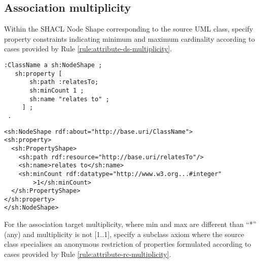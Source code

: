 \subsection{Association multiplicity}

\begin{trule}
	\label{rule:association-uni-multiplicity-dc}
	Within the SHACL Node Shape corresponding to the source UML class, specify property constraints indicating minimum and maximum cardinality according to cases provided by Rule \ref{rule:attribute-ds-multiplicity}.
\end{trule}

\vspace{-\parskip}\vspace{-\parskip}\vspace{-\parskip}
\begin{minipage}[b]{.385\textwidth}
\begin{lstlisting}[language=Turtle, caption={Min cardinality constraint in Turtle syntax}, captionpos=b]
 :ClassName a sh:NodeShape ;
   sh:property [
       sh:path :relatesTo;
       sh:minCount 1 ;
       sh:name "relates to" ;
     ] ;
 .
\end{lstlisting}
\end{minipage}%
\quad\vspace{-\parskip}
\begin{minipage}[b]{.6\textwidth}
\begin{lstlisting}[language=RDF/XML, caption={Min cardinality constraint in RDF/XML syntax}, captionpos=b]
<sh:NodeShape rdf:about="http://base.uri/ClassName">
<sh:property>
  <sh:PropertyShape>
    <sh:path rdf:resource="http://base.uri/relatesTo"/>
    <sh:name>relates to</sh:name>
    <sh:minCount rdf:datatype="http://www.w3.org...#integer"
        >1</sh:minCount>
  </sh:PropertyShape>
</sh:property>
</sh:NodeShape>
\end{lstlisting}
\end{minipage}
\vspace{-\parskip}\vspace{-\parskip}\vspace{-\parskip}

\begin{trule}
	\label{rule:association-uni-multiplicity-rc}
	For the association target multiplicity, where min and max are different than ``*'' (any) and multiplicity is not [1..1], specify a subclass axiom where the source class specialises an anonymous restriction of properties formulated according to cases provided by Rule \ref{rule:attribute-rc-multiplicity}.
\end{trule}

